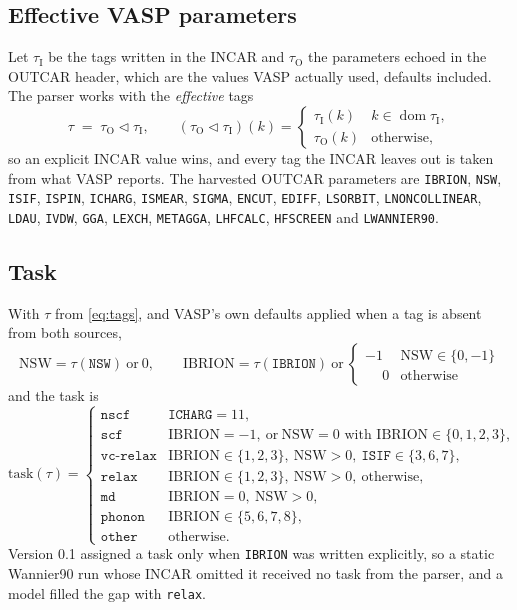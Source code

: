 \documentclass[11pt,a4paper]{article}
\newcommand{\vtag}[1]{\texttt{#1}}
\begin{document}
\subsection{Effective VASP parameters}\label{sec:vasp-tags}
Let \(\tau_{\mathrm{I}}\) be the tags written in the INCAR and \(\tau_{\mathrm{O}}\) the parameters echoed in the
OUTCAR header, which are the values VASP actually used, defaults included. The parser works with the
\emph{effective} tags
\begin{equation}
  \tau \;=\; \tau_{\mathrm{O}} \lhd \tau_{\mathrm{I}},\qquad
  (\tau_{\mathrm{O}}\lhd\tau_{\mathrm{I}})(k)=\begin{cases}\tau_{\mathrm{I}}(k) & k\in\operatorname{dom}\tau_{\mathrm{I}},\\ \tau_{\mathrm{O}}(k) & \text{otherwise,}\end{cases}
  \label{eq:tags}
\end{equation}
so an explicit INCAR value wins, and every tag the INCAR leaves out is taken from what VASP reports.
The harvested OUTCAR parameters are \vtag{IBRION}, \vtag{NSW}, \vtag{ISIF}, \vtag{ISPIN}, \vtag{ICHARG}, \vtag{ISMEAR},
\vtag{SIGMA}, \vtag{ENCUT}, \vtag{EDIFF}, \vtag{LSORBIT}, \vtag{LNONCOLLINEAR}, \vtag{LDAU}, \vtag{IVDW}, \vtag{GGA},
\vtag{LEXCH}, \vtag{METAGGA}, \vtag{LHFCALC}, \vtag{HFSCREEN} and \vtag{LWANNIER90}.

\subsection{Task}\label{sec:vasp-task}
With \(\tau\) from \eqref{eq:tags}, and VASP's own defaults applied when a tag is absent from both sources,
\begin{equation}
 \mathrm{NSW}=\tau(\vtag{NSW})\ \text{or}\ 0,\qquad
 \mathrm{IBRION}=\tau(\vtag{IBRION})\ \text{or}\ \begin{cases}-1 & \mathrm{NSW}\in\{0,-1\}\\ \phantom{-}0 & \text{otherwise}\end{cases}
\end{equation}
and the task is
\begin{equation}
 \mathrm{task}(\tau)=\begin{cases}
 \texttt{nscf} & \vtag{ICHARG}=11,\\
 \texttt{scf} & \mathrm{IBRION}=-1,\ \text{or}\ \mathrm{NSW}=0 \text{ with } \mathrm{IBRION}\in\{0,1,2,3\},\\
 \texttt{vc-relax} & \mathrm{IBRION}\in\{1,2,3\},\ \mathrm{NSW}>0,\ \vtag{ISIF}\in\{3,6,7\},\\
 \texttt{relax} & \mathrm{IBRION}\in\{1,2,3\},\ \mathrm{NSW}>0,\ \text{otherwise},\\
 \texttt{md} & \mathrm{IBRION}=0,\ \mathrm{NSW}>0,\\
 \texttt{phonon} & \mathrm{IBRION}\in\{5,6,7,8\},\\
 \texttt{other} & \text{otherwise}.
 \end{cases}
\end{equation}
Version 0.1 assigned a task only when \vtag{IBRION} was written explicitly, so a static Wannier90 run whose
INCAR omitted it received no task from the parser, and a model filled the gap with \texttt{relax}.
\end{document}
